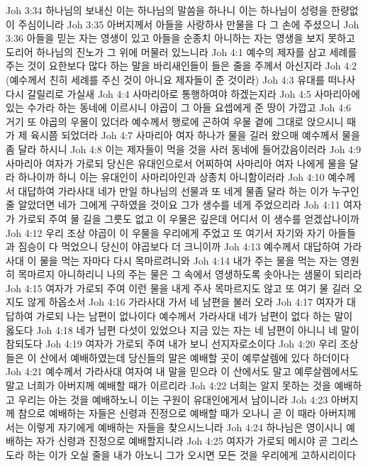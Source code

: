 Joh 3:34  하나님의 보내신 이는 하나님의 말씀을 하나니 이는 하나님이 성령을 한량없이 주심이니라
Joh 3:35  아버지께서 아들을 사랑하사 만물을 다 그 손에 주셨으니
Joh 3:36  아들을 믿는 자는 영생이 있고 아들을 순종치 아니하는 자는 영생을 보지 못하고 도리어 하나님의 진노가 그 위에 머물러 있느니라
Joh 4:1  예수의 제자를 삼고 세례를 주는 것이 요한보다 많다 하는 말을 바리새인들이 들은 줄을 주께서 아신지라
Joh 4:2  (예수께서 친히 세례를 주신 것이 아니요 제자들이 준 것이라)
Joh 4:3  유대를 떠나사 다시 갈릴리로 가실새
Joh 4:4  사마리아로 통행하여야 하겠는지라
Joh 4:5  사마리아에 있는 수가라 하는 동네에 이르시니 야곱이 그 아들 요셉에게 준 땅이 가깝고
Joh 4:6  거기 또 야곱의 우물이 있더라 예수께서 행로에 곤하여 우물 곁에 그대로 앉으시니 때가 제 육시쯤 되었더라
Joh 4:7  사마리아 여자 하나가 물을 길러 왔으매 예수께서 물을 좀 달라 하시니
Joh 4:8  이는 제자들이 먹을 것을 사러 동네에 들어갔음이러라
Joh 4:9  사마리아 여자가 가로되 당신은 유대인으로서 어찌하여 사마리아 여자 나에게 물을 달라 하나이까 하니 이는 유대인이 사마리아인과 상종치 아니함이러라
Joh 4:10  예수께서 대답하여 가라사대 네가 만일 하나님의 선물과 또 네게 물좀 달라 하는 이가 누구인줄 알았더면 네가 그에게 구하였을 것이요 그가 생수를 네게 주었으리라
Joh 4:11  여자가 가로되 주여 물 길을 그릇도 없고 이 우물은 깊은데 어디서 이 생수를 얻겠삽나이까
Joh 4:12  우리 조상 야곱이 이 우물을 우리에게 주었고 또 여기서 자기와 자기 아들들과 짐승이 다 먹었으니 당신이 야곱보다 더 크니이까
Joh 4:13  예수께서 대답하여 가라사대 이 물을 먹는 자마다 다시 목마르려니와
Joh 4:14  내가 주는 물을 먹는 자는 영원히 목마르지 아니하리니 나의 주는 물은 그 속에서 영생하도록 솟아나는 샘물이 되리라
Joh 4:15  여자가 가로되 주여 이런 물을 내게 주사 목마르지도 않고 또 여기 물 길러 오지도 않게 하옵소서
Joh 4:16  가라사대 가서 네 남편을 불러 오라
Joh 4:17  여자가 대답하여 가로되 나는 남편이 없나이다 예수께서 가라사대 네가 남편이 없다 하는 말이 옳도다
Joh 4:18  네가 남편 다섯이 있었으나 지금 있는 자는 네 남편이 아니니 네 말이 참되도다
Joh 4:19  여자가 가로되 주여 내가 보니 선지자로소이다
Joh 4:20  우리 조상들은 이 산에서 예배하였는데 당신들의 말은 예배할 곳이 예루살렘에 있다 하더이다
Joh 4:21  예수께서 가라사대 여자여 내 말을 믿으라 이 산에서도 말고 예루살렘에서도 말고 너희가 아버지께 예배할 때가 이르리라
Joh 4:22  너희는 알지 못하는 것을 예배하고 우리는 아는 것을 예배하노니 이는 구원이 유대인에게서 남이니라
Joh 4:23  아버지께 참으로 예배하는 자들은 신령과 진정으로 예배할 때가 오나니 곧 이 때라 아버지께서는 이렇게 자기에게 예배하는 자들을 찾으시느니라
Joh 4:24  하나님은 영이시니 예배하는 자가 신령과 진정으로 예배할지니라
Joh 4:25  여자가 가로되 메시야 곧 그리스도라 하는 이가 오실 줄을 내가 아노니 그가 오시면 모든 것을 우리에게 고하시리이다
